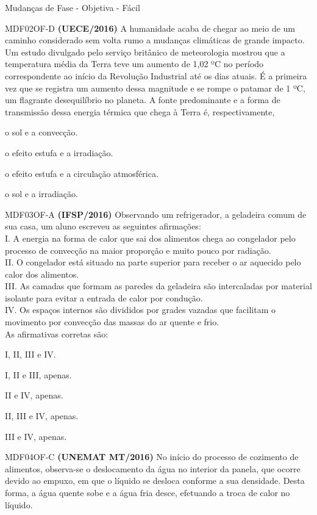\documentclass[12pt]{article}
\begin{document}
\begin{quiz}{Mudanças de Fase - Objetiva - Fácil}
		\begin{multi}[points=1,penalty=0]{MDF02OF-D}
			\textbf{(UECE/2016)} A humanidade acaba de chegar ao meio de um caminho considerado sem volta rumo a mudanças climáticas de grande impacto. Um estudo divulgado pelo serviço britânico de meteorologia mostrou que a temperatura média da Terra teve um aumento de 1,02 ºC no período correspondente ao início da Revolução Industrial até os dias atuais. É a primeira vez que se registra um aumento dessa magnitude e se rompe o patamar de 1 ºC, um flagrante desequilíbrio no planeta. A fonte predominante e a forma de transmissão dessa energia térmica que chega à Terra é, respectivamente,					
			\item o sol e a convecção.
			\item o efeito estufa e a irradiação.
			\item o efeito estufa e a circulação atmosférica.
			\item* o sol e a irradiação.
		\end{multi}
		\begin{multi}[points=1,penalty=0]{MDF03OF-A}
			\textbf{(IFSP/2016)} Observando um refrigerador, a geladeira comum de sua casa, um aluno escreveu as seguintes afirmações:\\			
			I.	A energia na forma de calor que sai dos alimentos chega ao congelador pelo processo de convecção na maior proporção e muito pouco por radiação.\\
			II.	O congelador está situado na parte superior para receber o ar aquecido pelo calor dos alimentos.\\
			III. As camadas que formam as paredes da geladeira são intercaladas por material isolante para evitar a entrada de calor por condução.\\
			IV.	Os espaços internos são divididos por grades vazadas que facilitam o movimento por convecção das massas do ar quente e frio.\\			
			As afirmativas corretas são:							
			\item* I, II, III e IV.
			\item I, II e III, apenas.
			\item II e IV, apenas.
			\item II, III e IV, apenas.
			\item III e IV, apenas.
		\end{multi}
		\begin{multi}[points=1,penalty=0]{MDF04OF-C}
			\textbf{(UNEMAT MT/2016)} No início do processo de cozimento de alimentos, observa-se o deslocamento da água no interior da panela, que ocorre devido ao empuxo, em que o líquido se desloca conforme a sua densidade. Desta forma, a água quente sobe e a água fria desce, efetuando a troca de calor no líquido.\\			

\end{multi}
\end{quiz}
\end{document}
